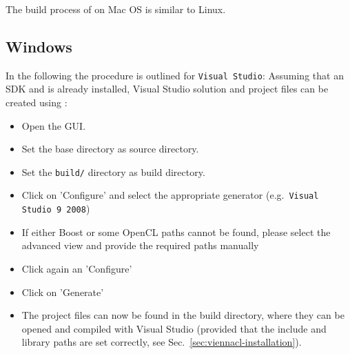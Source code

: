 
The build process of {\ViennaCL} on Mac OS is similar to Linux.

\subsection{Windows}
In the following the procedure is outlined for \texttt{Visual Studio}: Assuming that an {\OpenCL} SDK and {\CMake} is already installed, Visual Studio solution and project files can be created using {\CMake}:
\begin{itemize}
\item Open the {\CMake} GUI.
\item Set the {\ViennaCL} base directory as source directory.
\item Set the \texttt{build/} directory as build directory.
\item Click on 'Configure' and select the appropriate generator (e.g.~\texttt{Visual Studio 9 2008})
\item If either Boost or some OpenCL paths cannot be found, please select the advanced view and provide the required paths manually
\item Click again an 'Configure'
\item Click on 'Generate'
\item The project files can now be found in the {\ViennaCL} build directory, where they can be opened and compiled with Visual Studio (provided that the include and library paths are set correctly, see Sec.~\ref{sec:viennacl-installation}).
\end{itemize}







